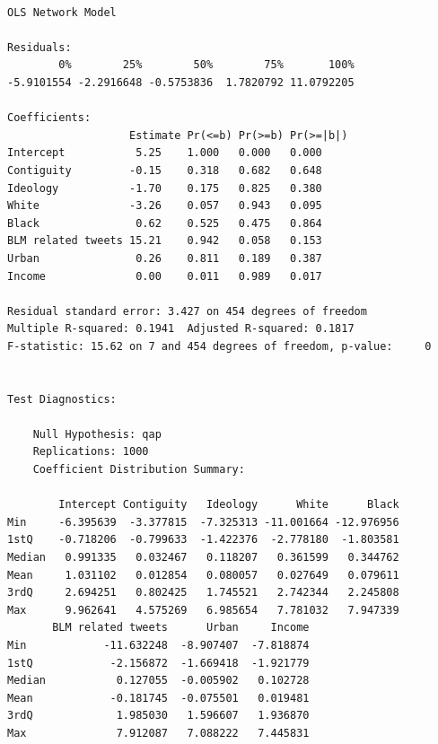 \documentclass[
  letterpaper,
  DIV=11,
  numbers=noendperiod]{scrartcl}
\begin{document}
\begin{verbatim}

OLS Network Model

Residuals:
        0%        25%        50%        75%       100% 
-5.9101554 -2.2916648 -0.5753836  1.7820792 11.0792205 

Coefficients:
                   Estimate Pr(<=b) Pr(>=b) Pr(>=|b|)
Intercept           5.25    1.000   0.000   0.000    
Contiguity         -0.15    0.318   0.682   0.648    
Ideology           -1.70    0.175   0.825   0.380    
White              -3.26    0.057   0.943   0.095    
Black               0.62    0.525   0.475   0.864    
BLM related tweets 15.21    0.942   0.058   0.153    
Urban               0.26    0.811   0.189   0.387    
Income              0.00    0.011   0.989   0.017    

Residual standard error: 3.427 on 454 degrees of freedom
Multiple R-squared: 0.1941  Adjusted R-squared: 0.1817 
F-statistic: 15.62 on 7 and 454 degrees of freedom, p-value:     0 


Test Diagnostics:

    Null Hypothesis: qap 
    Replications: 1000 
    Coefficient Distribution Summary:

        Intercept Contiguity   Ideology      White      Black
Min     -6.395639  -3.377815  -7.325313 -11.001664 -12.976956
1stQ    -0.718206  -0.799633  -1.422376  -2.778180  -1.803581
Median   0.991335   0.032467   0.118207   0.361599   0.344762
Mean     1.031102   0.012854   0.080057   0.027649   0.079611
3rdQ     2.694251   0.802425   1.745521   2.742344   2.245808
Max      9.962641   4.575269   6.985654   7.781032   7.947339
       BLM related tweets      Urban     Income
Min            -11.632248  -8.907407  -7.818874
1stQ            -2.156872  -1.669418  -1.921779
Median           0.127055  -0.005902   0.102728
Mean            -0.181745  -0.075501   0.019481
3rdQ             1.985030   1.596607   1.936870
Max              7.912087   7.088222   7.445831
\end{verbatim}
\end{document}
